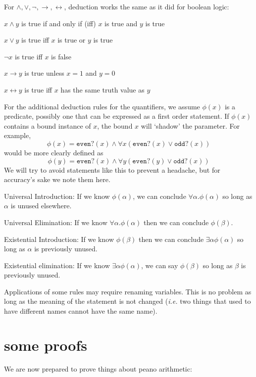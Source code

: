 \documentclass{scrbook}
\renewcommand{\implies}{\to}
\renewcommand{\iff}{\leftrightarrow}
\begin{document}
For $\wedge,\vee,\neg,\implies,\iff$, deduction works the same as it did for boolean logic:
\begin{trivlist}
\item $x \wedge y$ is true if and only if (iff) $x$ is true and $y$ is true
\item $x \vee y$ is true iff $x$ is true or $y$ is true 
\item $\neg x$ is true iff $x$ is false   
\item $x \implies y$ is true unless $x=1$ and $y=0$  
\item $x\iff y$ is true iff $x$ has the same truth value as $y$  
\end{trivlist}

For the additional deduction rules for the quantifiers,  we assume $\phi(x)$ is a predicate, possibly one that can be expressed as a first order statement. If $\phi(x)$ contains a bound instance of $x$, the bound $x$ will `shadow' the parameter. For example, 
\[
\phi(x)=\texttt{even?}(x) \wedge \forall x (\texttt{even?}(x)\vee \texttt{odd?}(x))
\]
would be more clearly defined as 
\[
\phi(y)=\texttt{even?}(x) \wedge \forall y (\texttt{even?}(y)\vee \texttt{odd?}(x))
\]
We will try to avoid statements like this to prevent a headache, but for accuracy's sake we note them here. 
\begin{trivlist}
\item Universal Introduction:
  If we know $\phi(\alpha)$, we can conclude $\forall \alpha . \phi(\alpha)$ so long as $\alpha$ is unused elsewhere.
\item Universal Elimination:
  If we know $\forall \alpha . \phi(\alpha)$ then we can conclude $\phi(\beta)$. 
\item Existential Introduction:
  If we know $\phi(\beta)$ then we can conclude $\exists \alpha \phi(\alpha)$ so long as $\alpha$ is previously unused.
\item Existential elimination:
  If we know $\exists \alpha \phi(\alpha)$, we can say $\phi(\beta)$ so long as $\beta$ is previously unused. 
\end{trivlist}
Applications of some rules may require renaming variables. This is no problem as long as the meaning of the statement is not changed (\emph{i.e.} two things that used to have different names cannot have the same name). 

\section[Some Proofs]{some proofs}
We are now prepared to prove things about peano arithmetic:
\end{document}
